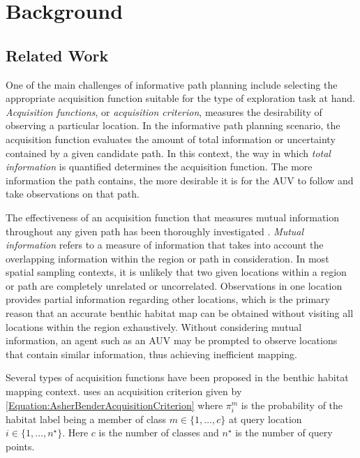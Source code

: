 \chapter{Background}
\label{Background}

	\section{Related Work}
	\label{Background:Related-Work}
	
		One of the main challenges of informative path planning include selecting the appropriate acquisition function suitable for the type of exploration task at hand. \textit{Acquisition functions}, or \textit{acquisition criterion}, measures the desirability of observing a particular location. In the informative path planning scenario, the acquisition function evaluates the amount of total information or uncertainty contained by a given candidate path. In this context, the way in which \textit{total information} is quantified determines the acquisition function. The more information the path contains, the more desirable it is for the AUV to follow and take observations on that path. 
		
		The effectiveness of an acquisition function that measures mutual information throughout any given path has been thoroughly investigated \citep{AsherBender, Rigby:ROB20372, Krause:2008:NSP:1390681.1390689, Kapoor}. \textit{Mutual information} refers to a measure of information that takes into account the overlapping information within the region or path in consideration. In most spatial sampling contexts, it is unlikely that two given locations within a region or path are completely unrelated or uncorrelated. Observations in one location provides partial information regarding other locations, which is the primary reason that an accurate benthic habitat map can be obtained without visiting all locations within the region exhaustively. Without considering mutual information, an agent such as an AUV may be prompted to observe locations that contain similar information, thus achieving inefficient mapping.
		
		Several types of acquisition functions have been proposed in the benthic habitat mapping context. \cite{AsherBender} uses an acquisition criterion given by \eqref{Equation:AsherBenderAcquisitionCriterion} where $\pi^{m}_{i}$ is the probability of the habitat label being a member of class $m \in \{1, \dots, c\}$ at query location $i \in \{1, \dots, n^{\star}\}$. Here $c$ is the number of classes and $n^{\star}$ is the number of query points.
		
